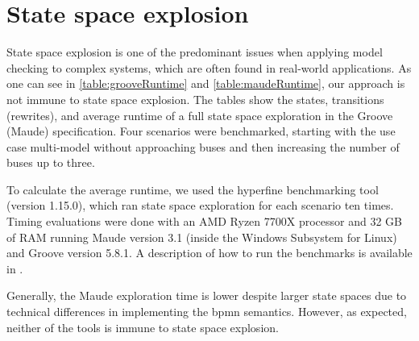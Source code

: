 \documentclass{jot}
\begin{document}
\section{State space explosion} \label{sec:state_space_explosion}
State space explosion is one of the predominant issues when applying model checking to complex systems, which are often found in real-world applications.
As one can see in \cref{table:grooveRuntime} and \cref{table:maudeRuntime}, our approach is not immune to state space explosion.
The tables show the states, transitions (rewrites), and average runtime of a full state space exploration in the Groove (Maude) specification.
Four scenarios were benchmarked, starting with the use case multi-model without approaching buses and then increasing the number of buses up to three.

To calculate the average runtime, we used the hyperfine benchmarking tool \cite{peterHyperfine2022} (version 1.15.0), which ran state space exploration for each scenario ten times.
Timing evaluations were done with an AMD Ryzen 7700X processor and 32 GB of RAM running Maude version 3.1 (inside the Windows Subsystem for Linux) and Groove version 5.8.1.
A description of how to run the benchmarks is available in \cite{krauterArtifactsBehavioralConsistency2022}.

Generally, the Maude exploration time is lower despite larger state spaces due to technical differences in implementing the \gls*{bpmn} semantics.
However, as expected, neither of the tools is immune to state space explosion.
\end{document}
